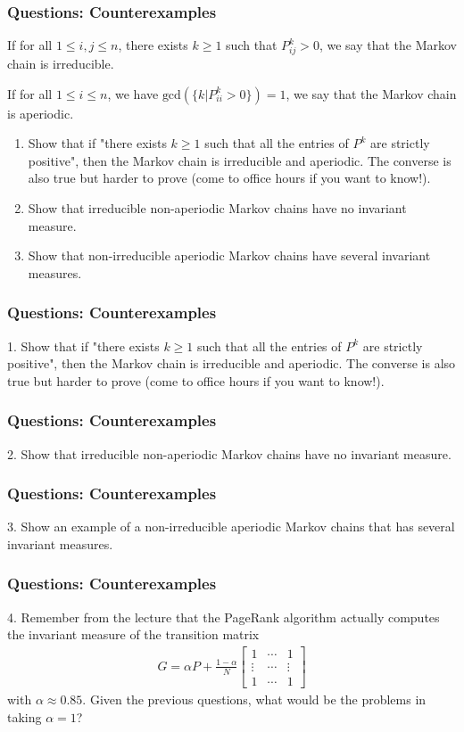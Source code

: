 \documentclass{beamer}
\begin{document}
\begin{frame}[t]
\frametitle{Questions: Counterexamples}
\begin{definition}
If for all $1 \leq i,j \leq n$, there exists $k \geq 1$ such that $P^{k}_{ij} > 0$, we say that the Markov chain is irreducible.
\end{definition}
\begin{definition}
If for all $1 \leq i \leq n$, we have $\text{gcd}(\{k | P_{ii}^{k} > 0\}) = 1$, we say that the Markov chain is aperiodic.
\end{definition}
\begin{enumerate}
\item Show that if "there exists $k \geq 1$ such that all the entries of $P^k$ are strictly positive", then the Markov chain is irreducible and aperiodic. The converse is also true but harder to prove (come to office hours if you want to know!).
\item Show that irreducible non-aperiodic Markov chains have no invariant measure.
\item Show that non-irreducible aperiodic Markov chains have several invariant measures.
\end{enumerate}
\end{frame}

\begin{frame}[t]
\frametitle{Questions: Counterexamples}
1. Show that if "there exists $k \geq 1$ such that all the entries of $P^k$ are strictly positive", then the Markov chain is irreducible and aperiodic. The converse is also true but harder to prove (come to office hours if you want to know!).
\pause
\end{frame}

\begin{frame}[t]
\frametitle{Questions: Counterexamples}
2. Show that irreducible non-aperiodic Markov chains have no invariant measure.
\pause
\end{frame}

\begin{frame}[t]
\frametitle{Questions: Counterexamples}
3. Show an example of a non-irreducible aperiodic Markov chains that has several invariant measures.
\pause
\end{frame}

\begin{frame}[t]
\frametitle{Questions: Counterexamples}
4. Remember from the lecture that the PageRank algorithm actually computes the invariant measure of the transition matrix
\begin{align*}
G = \alpha P + \frac{1-\alpha}{N} 
\begin{bmatrix} 
1 & \cdots & 1 \\
\vdots & \cdots & \vdots \\
1 & \cdots & 1
\end{bmatrix}
\end{align*}
with $\alpha \approx 0.85$. Given the previous questions, what would be the problems in taking $\alpha = 1$? 
\pause
\end{frame}
\end{document}
